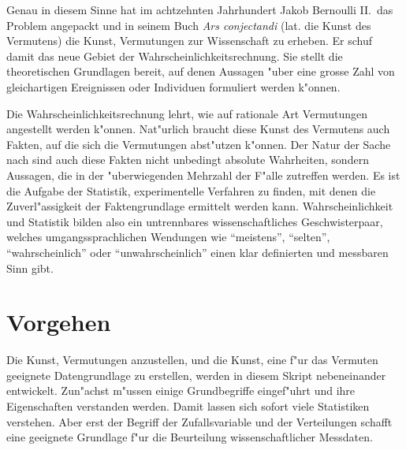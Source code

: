 Genau in diesem Sinne hat im achtzehnten Jahrhundert
Jakob Bernoulli II.~das Problem angepackt und in seinem Buch
{\em Ars conjectandi} (lat. die Kunst des Vermutens) die Kunst,
Vermutungen zur Wissenschaft zu erheben. Er schuf damit das
neue Gebiet der Wahrscheinlichkeitsrechnung. Sie stellt die theoretischen Grundlagen
bereit, auf denen Aussagen "uber eine grosse Zahl von gleichartigen
Ereignissen oder Individuen formuliert werden k"onnen.

Die Wahrscheinlichkeitsrechnung lehrt, wie auf rationale
Art Vermutungen angestellt werden k"onnen. Nat"urlich braucht diese
Kunst des Vermutens auch Fakten, auf die sich die Vermutungen
abst"utzen k"onnen. Der Natur der Sache nach sind auch diese
Fakten nicht unbedingt absolute Wahrheiten, sondern Aussagen,
die in der "uberwiegenden Mehrzahl der F"alle zutreffen werden.
Es ist die Aufgabe der Statistik, experimentelle Verfahren zu finden,
mit denen die Zuverl"assigkeit der Faktengrundlage ermittelt
werden kann. Wahrscheinlichkeit und Statistik bilden also ein
untrennbares wissenschaftliches Geschwisterpaar, welches umgangssprachlichen
Wendungen wie ``meistens'', ``selten'', ``wahrscheinlich'' oder  ``unwahrscheinlich''
einen klar definierten und messbaren Sinn gibt.

\section*{Vorgehen}
Die Kunst, Vermutungen anzustellen, und die Kunst, eine f"ur das Vermuten
geeignete Datengrundlage zu erstellen, werden in diesem Skript
nebeneinander entwickelt. Zun"achst m"ussen einige Grundbegriffe eingef"uhrt
und ihre Eigenschaften verstanden werden. Damit lassen sich sofort
viele Statistiken verstehen. Aber erst der Begriff der Zufallsvariable und
der Verteilungen schafft eine
geeignete Grundlage f"ur die Beurteilung wissenschaftlicher Messdaten.

